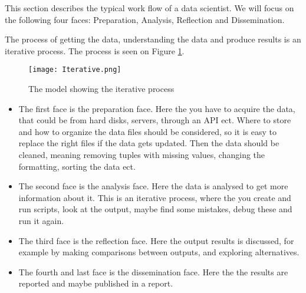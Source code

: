 \documentclass[Report.tex]{subfiles}
\begin{document}
This section describes the typical work flow of a data scientist. We will focus on the following four faces: Preparation, Analysis, Reflection and Dissemination.

The process of getting the data, understanding the data and produce results is an iterative process. The process is seen on Figure \ref{Fig:Iterative}.

\begin{figure}
\center
\texttt{[image: Iterative.png]}
\caption{The model showing the iterative process\cite[Chapter 2]{Guo}}
\label{Fig:Iterative}
\end{figure}
\begin{itemize}


\item The first face is the preparation face. Here the you have to acquire the data, that could be from hard disks, servers, through an API ect. Where to store and how to organize the data files should be considered, so it is easy to replace the right files if the data gets updated. Then the data should be cleaned, meaning removing tuples with missing values, changing the formatting, sorting the data ect.


\item The second face is the analysis face. Here the data is analysed to get more information about it. This is an iterative process, where the you create and run scripts,  look at the output, maybe find some mistakes, debug these and run it again. 

\item The third face is the reflection face. Here the output results is discussed, for example by making comparisons between outputs, and exploring alternatives.

\item The fourth and last face is the dissemination face. Here the the results are reported and maybe published in a report.
\cite[Chapter 2]{Guo}


\end{itemize}
\end{document}
